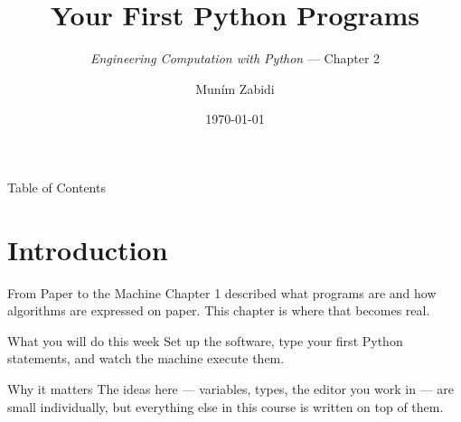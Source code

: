 \documentclass[9pt,aspectratio=169,xcolor=table]{beamer}
\title{Your First Python Programs}
\subtitle{\emph{Engineering Computation with Python} --- Chapter 2}
\author{Mun\'{i}m Zabidi}
\institute{\color{primary}Faculty of Electrical Engineering, Universiti Teknologi Malaysia}
\date{\today}
\begin{document}
\titlepage

\begin{frame}{Table of Contents}
    \tableofcontents
\end{frame}

\section{Introduction}

\begin{frame}{From Paper to the Machine}
    \leavevmode
    Chapter 1 described what programs are and how algorithms are expressed
    on paper. This chapter is where that becomes real.

    \vspace{3mm}
    \begin{block}{What you will do this week}
        Set up the software, type your first Python statements, and watch
        the machine execute them.
    \end{block}

    \vspace{2mm}
    \begin{alertblock}{Why it matters}
        The ideas here --- variables, types, the editor you work in --- are
        small individually, but \alert{everything else in this course is
        written on top of them}.
    \end{alertblock}
\end{frame}
\end{document}
